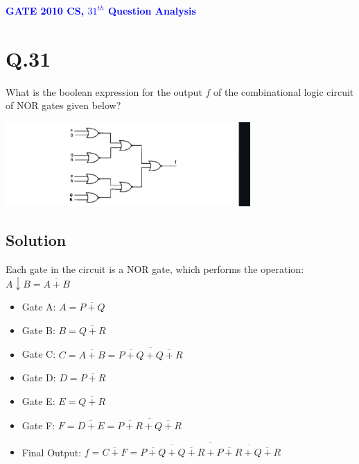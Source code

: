 \documentclass[a4paper,12pt]{article}
\begin{document}
\thispagestyle{fancy}
\fancyhf{}
\renewcommand{\headrulewidth}{0pt}
\fancyfoot[C]{\thepage}

\vspace*{1cm}
\begin{center}
    {\LARGE \textbf{\textcolor{blue}{GATE 2010 CS, $31^{th}$ Question Analysis}}}
\end{center}
\section*{Q.31}
What is the boolean expression for the output $f$ of the combinational logic circuit of NOR gates given below?

\begin{center}
\includegraphics[width=0.7\textwidth]{Circuit.jpg}
\end{center}

\subsection*{Solution}

Each gate in the circuit is a NOR gate, which performs the operation:
$
A \downarrow B = \overline{A + B}
$

\begin{itemize}
    \item Gate A: $A = \overline{P + Q}$
    \item Gate B: $B = \overline{Q + R}$
    \item Gate C: $C = \overline{A + B} = \overline{\overline{P + Q} + \overline{Q + R}}$
    \item Gate D: $D = \overline{P + R}$
    \item Gate E: $E = \overline{Q + R}$
    \item Gate F: $F = \overline{D + E} = \overline{\overline{P + R} + \overline{Q + R}}$
    \item Final Output: 
    $
    f = \overline{C + F} = \overline{ \overline{ \overline{P + Q} + \overline{Q + R} } + \overline{ \overline{P + R} + \overline{Q + R} } }
    $
\end{itemize}
\end{document}
